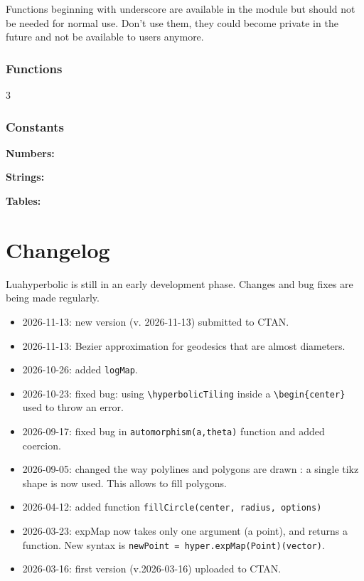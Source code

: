\documentclass{article}
\begin{document}
Functions beginning with underscore are available in the module but should not be needed for normal use. Don't use them, they could become private in the future and not be available to users anymore.

\subsubsection*{Functions}
\begin{multicols}{3}
\noindent{}
\end{multicols}
\subsubsection*{Constants}

\noindent\textbf{Numbers: }


\noindent\textbf{Strings: }
{\sloppy{}\par}


\noindent\textbf{Tables: }


\section{Changelog}
\label{section:changelog}

Luahyperbolic is still in an early development phase.
Changes and bug fixes are being made regularly.

\begin{itemize}
\item 2026-11-13: new version (v. 2026-11-13) submitted to CTAN.
\item 2026-11-13: Bezier approximation for geodesics that are almost diameters.
\item 2026-10-26: added \verb+logMap+.
\item 2026-10-23: fixed bug: using \verb+\hyperbolicTiling+ inside a \verb+\begin{center}+ used to throw an error.
\item 2026-09-17: fixed bug in \verb+automorphism(a,theta)+ function and added coercion.
\item 2026-09-05: changed the way polylines and polygons are drawn : a single tikz shape is now used. This allows to fill polygons.
\item 2026-04-12: added function \verb+fillCircle(center, radius, options)+
\item 2026-03-23: expMap now takes only one argument (a point), and returns a function. New syntax is \verb+newPoint = hyper.expMap(Point)(vector)+.
\item 2026-03-16: first version (v.2026-03-16) uploaded to CTAN.
\end{itemize}


\printindex
\end{document}
